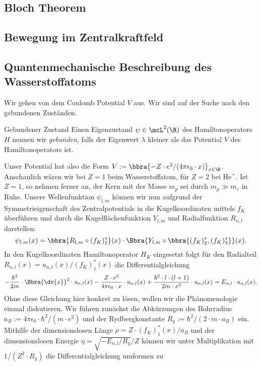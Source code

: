 \documentclass{subfiles}
\begin{document}
 
    \subsection*{Bloch Theorem} 

    \subsection{Bewegung im Zentralkraftfeld}
        

    \subsection{Quantenmechanische Beschreibung des Wasserstoffatoms}
        Wir gehen von dem Coulomb Potential $V$ aus. Wir sind auf der Suche nach den gebundenen Zuständen.
        \begin{mdef}{Gebundener Zustand}
            Einen Eigenzustand $\psi\in\mcL^2(\R)$ des Hamiltonoperators $H$ nennen wir \emph{gebunden}, falls der Eigenwert $\lambda$ kleiner als das Potential $V$ des Hamiltonoperators ist. 
        \end{mdef}
        Unser Potential hat also die Form $V := \bbra{-Z\cdot e^2/(4\pi\epsilon_0\cdot x)}_{x\in\R}$. Anschaulich wären wir bei $Z=1$ beim Wasserstoffatom, für $Z = 2$ bei $\text{He}^+$. Ist $Z = 1$, so nehmen ferner an, der Kern mit der Masse $m_p$ sei durch $m_p\gg m_e$ in Ruhe. Unsere Wellenfunktion $\psi_{l,m}$ können wir nun aufgrund der Symmetrieigenschaft des Zentralpotentials in die Kugelkoordinaten mittels $f_K$ überführen und durch die Kugelflächenfunktion $Y_{l,m}$ und Radialfunktion $R_{n,l}$ darstellen:
        \[
            \psi_{l,m}(x) = \bbra{R_{l,m}\circ (f_K)_1^*}(x) \cdot \Bbra{Y_{l,m}\circ\bbra{(f_K)_2^*,(f_K)_3^*}}(x).
        \]
        In den Kugelkoordinaten Hamiltonoperator $H_K$ eingesetzt folgt für den Radialteil $R_{n,l}(x) = u_{n,l}(x) / (f_K)_1^*(x)$ die Differentialgleichung
        \[
            -\frac{\hbar^2}{2m}\cdot\Bbra{\dv{x}}^2\cdot u_{n,l}(x) - \frac{Z\cdot e^2}{4\pi\epsilon_0\cdot x}\cdot u_{n,l}(x) + \frac{\hbar^2\cdot l\cdot(l+1)}{2m\cdot x^2}\cdot u_{n,l}(x) = E_{n,l}\cdot u_{n,l}(x).
        \]
        Ohne diese Gleichung hier konkret zu lösen, wollen wir die Phänomenologie einmal diskutieren. Wir führen zunächst die Abkürzungen des Bohrradius $a_B := 4\pi\epsilon_0\cdot\hbar^2/(m\cdot e^2)$ und der Rydbergkonstante $R_y := \hbar^2/(2\cdot m\cdot a_B)$ ein. Mithilfe der dimensionslosen Länge $\rho = Z\cdot (f_K)_1^*(x)/a_B$ und der dimensionslosen Energie $\eta = \sqrt{-E_{n,l}/R_y}/ Z$ können wir unter Multiplikation mit $1 / (Z^2\cdot R_y)$ die Differentialgleichung umformen zu
\end{document}
